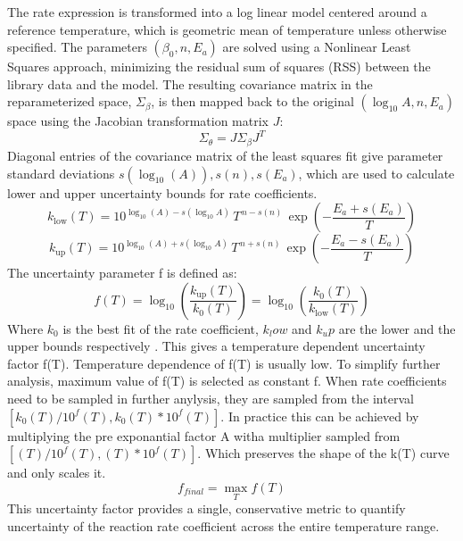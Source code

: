 The rate expression is transformed into a log linear model centered around a reference temperature, which is geometric mean of temperature unless otherwise specified. The parameters $(\beta_0, n, E_a)$ are solved using a Nonlinear Least Squares approach, minimizing the residual sum of squares (RSS) between the library data and the model. The resulting covariance matrix in the reparameterized space, $\Sigma_{\beta}$, is then mapped back to the original $( \log_{10} A, n, E_a )$ space using the Jacobian transformation matrix $J$:
\begin{equation}
\Sigma_{\theta} = J \Sigma_{\beta} J^T
\end{equation}
Diagonal entries of the covariance matrix of the least squares fit give parameter standard deviations $s\left(\log_{10}{\left(A\right)}\right), s\left(n\right), s\left(E_a\right)$, which are used to calculate lower and upper uncertainty bounds for rate coefficients.
\begin{equation}
	k_{\mathrm{low}}(T) =
	10^{\log_{10}(A) - s(\log_{10} A)}\,
	T^{\,n - s(n)}\,
	\exp\left(-\frac{E_a + s(E_a)}{T}\right)
\end{equation}
\begin{equation}
	k_{\mathrm{up}}(T) =
	10^{\log_{10}(A) + s(\log_{10} A)}\,
	T^{\,n + s(n)}\,
	\exp\left(-\frac{E_a - s(E_a)}{T}\right)
\end{equation}
The uncertainty parameter f is defined as:
\begin{equation}
	f(T) =
	\log_{10}\!\left(\frac{k_{\mathrm{up}}(T)}{k_0(T)}\right)
	=
	\log_{10}\!\left(\frac{k_0(T)}{k_{\mathrm{low}}(T)}\right)
\end{equation}
Where $k_0$ is the best fit of the rate coefficient, $k_low$ and $k_up$ are the lower and the upper bounds respectively \cite{nagy_uncertainty_2015}.  This gives a temperature dependent uncertainty factor f(T). Temperature dependence of f(T) is usually low. To simplify further analysis, maximum value of f(T) is selected as constant f. When rate coefficients need to be sampled in further anylysis, they are sampled from the interval 
$\left[k_0\left(T\right)/{10}^f\left(T\right),k_0\left(T\right)\ast{10}^f\left(T\right)\right]$. In practice this can be achieved by multiplying the pre exponantial factor A witha  multiplier sampled from $\left[\left(T\right)/{10}^f\left(T\right),\left(T\right)\ast{10}^f\left(T\right)\right]$.
Which preserves the shape of the k(T) curve and only scales it.
\begin{equation}
	f_{final} =  \max_{T} f(T)
\end{equation}
This uncertainty factor provides a single, conservative metric to quantify uncertainty of the reaction rate coefficient across the entire temperature range.
 

